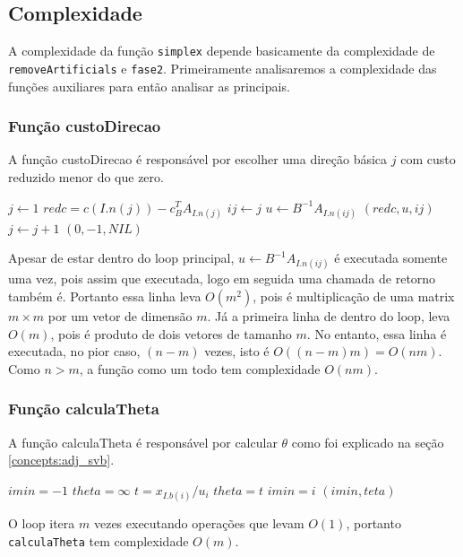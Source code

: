 \documentclass[12pt]{article}
\begin{document}
\subsection{Complexidade}
	A complexidade da função \texttt{simplex} depende basicamente da complexidade de \texttt{removeArtificials} e \texttt{fase2}. Primeiramente analisaremos a complexidade das funções auxiliares para então analisar as principais.

\subsubsection{Função custoDirecao}
A função custoDirecao é responsável por escolher uma direção básica $j$ com custo reduzido menor do que zero.
\begin{algorithmic}
	\State $j \gets 1$
		\State $redc = c(I.n(j)) - c^T_BA_{I.n(j)}$
			\State $ij \gets j$
			\State $u \gets B^{-1}A_{I.n(ij)}$
			\Return $(redc, u, ij)$
		\EndIf
		\State $j \gets j + 1$		
	\EndWhile
	\Return $(0, -1, NIL)$
\EndFunction
\end{algorithmic}

	Apesar de estar dentro do loop principal, $u \gets B^{-1}A_{I.n(ij)}$ é executada somente uma vez, pois assim que executada, logo em seguida uma chamada de retorno também é. Portanto essa linha leva $O(m^2)$, pois é multiplicação de uma matrix $m \times m$ por um vetor de dimensão $m$. Já a primeira linha de dentro do loop, leva $O(m)$, pois é produto de dois vetores de tamanho $m$. No entanto, essa linha é executada, no pior caso, $(n - m)$ vezes, isto é $O((n-m)m) = O(nm)$. Como $n > m$, a função como um todo tem complexidade $O(nm)$.

\subsubsection{Função calculaTheta}
A função calculaTheta é responsável por calcular $\theta$ como foi explicado na seção \ref{concepts:adj_svb}.
\begin{algorithmic}
	\State $imin = -1$
	\State $theta = \infty$
			\State $t = x_{I.b(i)} / u_i$
				\State $theta = t$
				\State $imin = i$
			\EndIf
		\EndIf
	\EndFor
	\Return $(imin, teta)$
\EndFunction
\end{algorithmic}

O loop itera $m$ vezes executando operações que levam $O(1)$, portanto \texttt{calculaTheta} tem complexidade $O(m)$.
\end{document}
